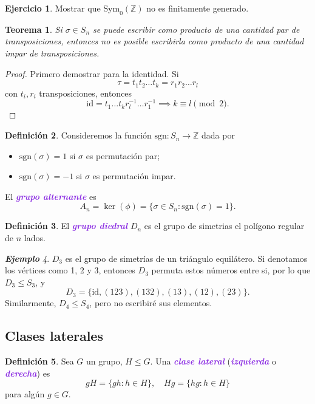 \documentclass{article}
\newtheorem{theorem}{Teorema}[subsection]
\theoremstyle{definition}
\newtheorem{definition}[theorem]{Definición}
\newtheorem{exercise}{Ejercicio}
\theoremstyle{remark}
\newtheorem{example}[theorem]{\textbf{Ejemplo}}
\numberwithin{equation}{section}
\newcommand{\Z}{\mathbb{Z}}
\newcommand{\sgn}{\mathrm{sgn}}
\newcommand{\id}{\mathrm{id}}
\newcommand{\Sym}{\mathrm{Sym}}
\newcommand{\wea}[1]{\textcolor{BlueViolet}{\textbf{\emph{#1}}}}
\begin{document}
\begin{exercise}
  Mostrar que $\Sym_0(\Z)$ no es finitamente generado.
\end{exercise}

\begin{theorem}
  Si $\sigma \in S_n$ se puede escribir como producto de una cantidad par de transposiciones, entonces no es posible escribirla como producto de una cantidad impar de transposiciones.
\end{theorem}
\begin{proof}
  Primero demostrar para la identidad. %
  Si
  \[\tau = t_1 t_2 \dots t_k = r_1 r_2 \dots r_l\]
  con $t_i, r_i$ transposiciones, entonces
  \[\id = t_1 \dots t_k r_l^{-1} \dots r_1^{-1}
  \implies k \equiv l \pmod 2.\]
\end{proof}

\begin{definition}
  Consideremos la función $\sgn \colon S_n \to \Z$ dada por
  \begin{itemize}
    \item $\sgn(\sigma) = 1$ si $\sigma$ es permutación par;
    \item $\sgn(\sigma) = -1$ si $\sigma$ es permutación impar.
  \end{itemize}
  El \wea{grupo alternante} es
  \[A_n = \ker(\phi) = \{\sigma \in S_n \colon \sgn(\sigma) = 1\}.\]
\end{definition}

\begin{definition}
  El \wea{grupo diedral} $D_n$ es el grupo de simetrias el polígono regular de $n$ lados.
\end{definition}

\begin{example}
  $D_3$ es el grupo de simetrías de un triángulo equilátero. Si denotamos los vértices como 1, 2 y 3, entonces $D_3$ permuta estos números entre si, por lo que $D_3 \leqslant S_3$, y
  \[D_3 = \{\id, (123), (132), (13), (12), (23)\}.\]
  Similarmente, $D_4 \leqslant S_4$, pero no escribiré sus elementos.
\end{example}

\newpage
\subsection{Clases laterales}

\begin{definition}
  Sea $G$ un grupo, $H \leqslant G$. Una \wea{clase lateral} (\wea{izquierda} o \wea{derecha}) es
  \[gH = \{gh \colon h \in H\}, \quad Hg = \{hg \colon h \in H\}\]
  para algún $g \in G$.
\end{definition}
\end{document}
